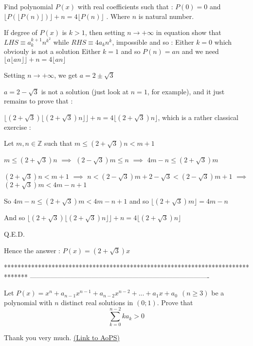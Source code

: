 \begin{solution}
	\begin{tcolorbox}Find polynomial $P(x)$  with real coefficients such that : $P(0)=0$ and $\lfloor{P(\lfloor{P(n)}\rfloor)}\rfloor+n=4 \lfloor{P(n)}\rfloor $ .
Where $n$ is natural number.\end{tcolorbox}
If degree of $P(x)$ is $k>1$, then setting $n\to+\infty$ in equation show that $LHS\equiv a_k^{k+1}n^{k^2}$ while $RHS\equiv 4a_kn^k$, impossible and so :
Either $k=0$ which obviouly is not a solution
Either $k=1$ and so $P(n)=an$ and we need $\lfloor a\lfloor an\rfloor\rfloor+n=4\lfloor an\rfloor$

Setting $n\to+\infty$, we get $a=2\pm\sqrt 3$

$a=2-\sqrt 3$ is not a solution (just look at $n=1$, for example), and it just remains to prove that :

$\lfloor (2+\sqrt 3)\lfloor (2+\sqrt 3)n\rfloor\rfloor+n=4\lfloor (2+\sqrt 3)n\rfloor$, which is a rather classical exercise :

Let $m,n\in\mathbb Z$ such that $m\le (2+\sqrt 3)n <m+1$

$m\le (2+\sqrt 3)n$ $\implies$ $(2-\sqrt 3)m\le n$ $\implies$ $4m-n\le (2+\sqrt 3)m$

$(2+\sqrt 3)n <m+1$ $\implies$ $n<(2-\sqrt 3)m+2-\sqrt 3<(2-\sqrt 3)m+1$ $\implies$ $(2+\sqrt 3)m<4m-n+1$

So $4m-n\le (2+\sqrt 3)m<4m-n+1$ and so $\lfloor(2+\sqrt 3)m\rfloor=4m-n$

And so $\lfloor(2+\sqrt 3)\lfloor(2+\sqrt 3)n\rfloor\rfloor+n=4\lfloor(2+\sqrt 3)n\rfloor$

Q.E.D.

Hence the answer : $\boxed{P(x)=(2+\sqrt 3)x}$
\end{solution}
*******************************************************************************
-------------------------------------------------------------------------------

\begin{problem}
	Let $P(x)=x^n+a_{n-1}x^{n-1}+a_{n-2}x^{n-2}+...+a_1x+a_0 \ \ (n \ge 3)$ be a polynomial with $n$ distinct real solutions in $(0;1)$. Prove that \[\sum_{k=0}^{n-2} k a_k > 0\]

Thank you very much.
	\flushright \href{https://artofproblemsolving.com/community/c6h567870}{(Link to AoPS)}
\end{problem}



